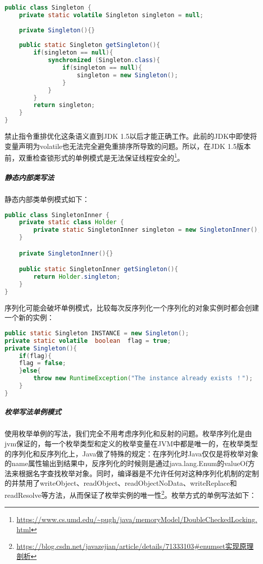 \documentclass[../../../interview-questions.tex]{subfiles}
\begin{document}
\begin{lstlisting}[language=Java]
public class Singleton {
    private static volatile Singleton singleton = null;
 
    private Singleton(){}
 
    public static Singleton getSingleton(){
        if(singleton == null){
            synchronized (Singleton.class){
                if(singleton == null){
                    singleton = new Singleton();
                }
            }
        }
        return singleton;
    }    
}
\end{lstlisting}

禁止指令重排优化这条语义直到JDK 1.5以后才能正确工作。此前的JDK中即使将变量声明为volatile也无法完全避免重排序所导致的问题。所以，在JDK 1.5版本前，双重检查锁形式的单例模式是无法保证线程安全的\footnote{\url{https://www.cs.umd.edu/~pugh/java/memoryModel/DoubleCheckedLocking.html}}。

\subparagraph{静态内部类写法}

静态内部类单例模式如下：

\begin{lstlisting}[language=Java]
public class SingletonInner {
    private static class Holder {
        private static SingletonInner singleton = new SingletonInner();
    }

    private SingletonInner(){}

    public static SingletonInner getSingleton(){
        return Holder.singleton;
    }
}
\end{lstlisting}

序列化可能会破坏单例模式，比较每次反序列化一个序列化的对象实例时都会创建一个新的实例：

\begin{lstlisting}[language=Java]
public static Singleton INSTANCE = new Singleton();     
private static volatile  boolean  flag = true;
private Singleton(){
    if(flag){
    flag = false;   
    }else{
        throw new RuntimeException("The instance already exists ！");
    }
}
\end{lstlisting}

\subparagraph{枚举写法单例模式}

使用枚举单例的写法，我们完全不用考虑序列化和反射的问题。枚举序列化是由jvm保证的，每一个枚举类型和定义的枚举变量在JVM中都是唯一的，在枚举类型的序列化和反序列化上，Java做了特殊的规定：在序列化时Java仅仅是将枚举对象的name属性输出到结果中，反序列化的时候则是通过java.lang.Enum的valueOf方法来根据名字查找枚举对象。同时，编译器是不允许任何对这种序列化机制的定制的并禁用了writeObject、readObject、readObjectNoData、writeReplace和readResolve等方法，从而保证了枚举实例的唯一性\footnote{\url{https://blog.csdn.net/javazejian/article/details/71333103\#enumset实现原理剖析}}。枚举方式的单例写法如下：
\end{document}
